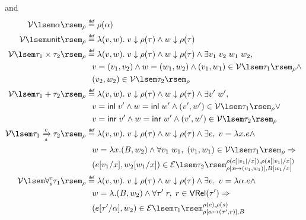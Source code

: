 \documentclass[preprint]{sigplanconf}
\newcommand{\arrow}[4]{#1\xrightarrow[#3]{#2}#4}
\newcommand{\syminl}{\mathsf{inl}}
\newcommand{\syminr}{\mathsf{inr}}
\newcommand{\symunit}{\mathsf{unit}}
\newcommand{\relV}[1]{\mathcal{V}\lsem#1\rsem}
\newcommand{\relE}[1]{\mathcal{E}\lsem#1\rsem}
\newcommand\defeq{\mathrel{\overset{\makebox[0pt]{\mbox{\normalfont\tiny\sffamily def}}}{=}}}
\begin{document}
\begin{figure}
\fbox{$\relV{\tau}$} and \fbox{$\relE{\tau}$}
{\small
\begin{align*}
  \relV{\alpha}_\rho &\defeq \rho(\alpha) \\
  \relV{\symunit}_\rho &\defeq \lambda(v,w).\; v \downarrow \rho(\tau) \wedge w \downarrow \rho(\tau) \\
  \relV{\tau_1\times\tau_2}_\rho &\defeq \lambda(v,w).\; v \downarrow \rho(\tau) \wedge w \downarrow \rho(\tau) \wedge \exists v_1\;v_2\;w_1\;w_2, \\
  & \hspace{.1in} v=(v_1,v_2) \wedge w=(w_1,w_2) \wedge (v_1,w_1) \in \relV{\tau_1}_\rho \wedge \\
  & \hspace{.1in} (v_2,w_2) \in \relV{\tau_2}_\rho \\
  \relV{\tau_1+\tau_2}_\rho &\defeq \lambda(v,w).\; v \downarrow \rho(\tau) \wedge w \downarrow \rho(\tau) \wedge \exists v'\;w', \\
  & \hspace{.1in} v=\syminl\;v' \wedge w=\syminl\;w' \wedge (v',w') \in \relV{\tau_1}_\rho \vee \\
  & \hspace{.1in} v=\syminr\;v' \wedge w=\syminr\;w' \wedge (v',w') \in \relV{\tau_2}_\rho \\
  \relV{\arrow{\tau_1}{c}{s}{\tau_2}}_\rho &\defeq \lambda (v,w).\;v \downarrow \rho(\tau) \wedge w \downarrow \rho(\tau) \wedge \exists e,\;v=\lambda x.e \wedge \\
  & \hspace{.1in} w=\lambda x.(B,w_2) \wedge \forall v_1\;w_1,\;(v_1,w_1) \in \relV{\tau_1}_\rho \Rightarrow \\
  & \hspace{.1in} (e[v_1/x], w_2[w_1/x])\in \relE{\tau_2}^{\rho(c[|v_1|/x]),\rho(s[|v_1|/x])}_{\rho[x\mapsto(v_1,w_1)],B[w_1/x]} \\
  \relV{\forall^c_s\tau_1}_\rho &\defeq \lambda (v,w).\;v \downarrow \rho(\tau) \wedge w \downarrow \rho(\tau) \wedge \exists e,\;v=\lambda\alpha.e \wedge \\
  & \hspace{.1in} w=\lambda.(B,w_2) \wedge \forall \tau'\;r,\;r \in \mathsf{VRel}(\tau') \Rightarrow \\
  & \hspace{.1in} (e[\tau'/\alpha], w_2)\in \relE{\tau_1}^{\rho(c),\rho(s)}_{\rho[\alpha\mapsto(\tau',r)],B} \\

\end{align*}}
\end{figure}
\end{document}
